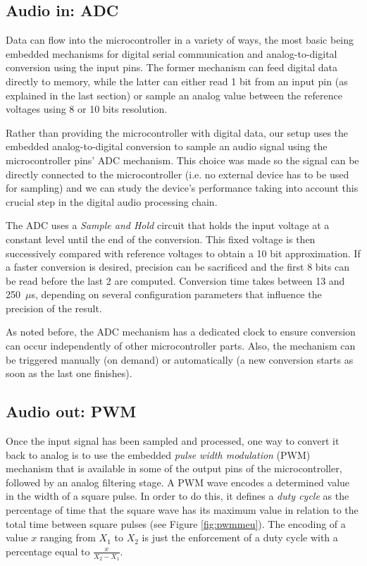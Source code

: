 \subsection{Audio in: ADC}

Data can flow into the microcontroller in a variety of ways, the most basic
being embedded mechanisms for digital serial communication and analog-to-digital conversion using the input pins. The
former mechanism can feed digital data directly to memory, while the latter
can either read 1 bit from an input pin (as explained in the last section) or sample an
analog value between the reference voltages using 8 or 10 bits resolution.

Rather than providing the microcontroller with digital data, our setup uses
the embedded analog-to-digital conversion to sample an audio signal using
the microcontroller pins' ADC mechanism. This choice was made so the signal
can be directly connected to the microcontroller (i.e. no external device has
to be used for sampling) and we can study the device's performance taking into
account this crucial step in the digital audio processing chain.

The ADC uses a \emph{Sample and Hold} circuit that holds the input voltage at
a constant level until the end of the conversion. This fixed voltage is then
successively compared with reference voltages to obtain a 10 bit
approximation. If a faster conversion is desired, precision can be sacrificed
and the first 8 bits can be read before the last 2 are computed. Conversion
time takes between 13 and 250~$\mu$s, depending on several configuration
parameters that influence the precision of the
result.

As noted before, the ADC mechanism has a dedicated clock to ensure conversion
can occur independently of other microcontroller parts. Also, the mechanism
can be triggered manually (on demand) or automatically (a new conversion
starts as soon as the last one finishes).

\subsection{Audio out: PWM}
\label{sec:pwm}

Once the input signal has been sampled and processed, one way to convert it
back to analog is to use the embedded \emph{pulse width modulation} (PWM) mechanism that is available in some
of the output pins of the microcontroller, followed by an analog filtering
stage. A PWM wave encodes a determined value in the width of a square pulse.
In order to do this, it defines a \emph{duty cycle} as the percentage of time
that the square wave has its maximum value in relation to the total time between square pulses (see Figure \ref{fig:pwmmeu}). The encoding of a value $x$
ranging from $X_1$ to $X_2$ is just the enforcement of a duty cycle with a
percentage equal to $\frac{x}{X_2-X_1}$.

